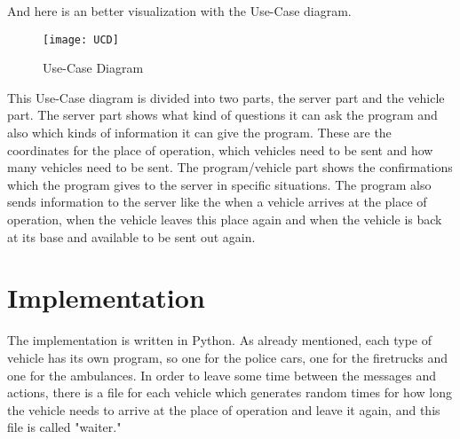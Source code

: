 \documentclass{article}
\begin{document}
And here is an better visualization with the Use-Case diagram.
\newline
\newline
\begin{figure}[htp]
    \centering
\texttt{[image: UCD]}
   \caption{Use-Case Diagram}
    \label{fig:GALAXY}
\end{figure}
\newline
\newline
This Use-Case diagram is divided into two parts, the server part and the vehicle part.
\newline
The server part shows what kind of questions it can ask the program and also which kinds of information it can give the program. These are the coordinates for the place of operation, which vehicles need to be sent and how many vehicles need to be sent.
\newline
The program/vehicle part shows the confirmations which the program gives to the server in specific situations. 
\newline
The program also sends information to the server like the when a vehicle arrives at the place of operation, when the vehicle leaves this place again and when the vehicle is back at its base and available to be sent out again.
\clearpage

\section{Implementation}


The implementation is written in Python. As already mentioned, each type of vehicle has its own program, so one for the police cars, one for the firetrucks and one for the ambulances. 
\newline
In order to leave some time between the messages and actions, there is a file for each vehicle which generates random times for how long the vehicle needs to arrive at the place of operation and leave it again, and this file is called "waiter."
\end{document}
